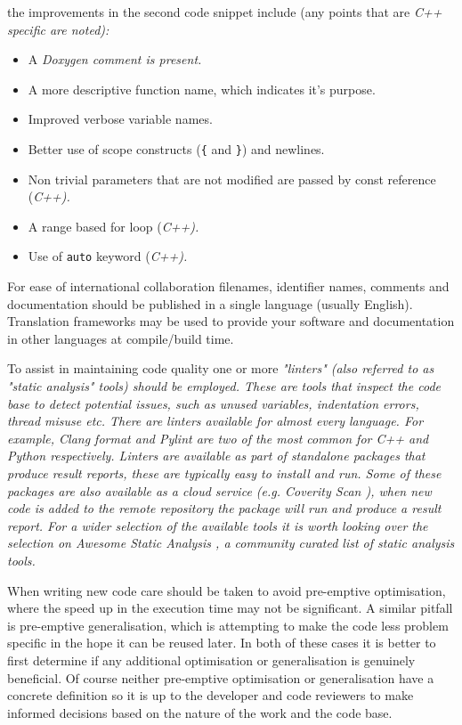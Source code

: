 \documentclass[jnr]{iosart2x}
\begin{document}
the improvements in the second code snippet include (any points that are \it{C++} specific are noted):
\begin{itemize}
  \item{A \it Doxygen \cite{doxygen} comment is present.}
  \item{A more descriptive function name, which indicates it's purpose.}
  \item{Improved verbose variable names.}
  \item{Better use of scope constructs (\texttt{\{} and \texttt{\}}) and newlines.}
  \item{Non trivial parameters that are not modified are passed by const reference (\it C++).}
  \item{A range based for loop (\it C++).}
  \item{Use of \texttt{auto} keyword (\it C++).}
\end{itemize}

For ease of international collaboration filenames, identifier names, comments and documentation should be published in a single language (usually English).
Translation frameworks may be used to provide your software and documentation in other languages at compile/build time.

To assist in maintaining code quality one or more \it{"linters"} (also referred to as "static analysis" tools) should be employed.
These are tools that inspect the code base to detect potential issues, such as unused variables, indentation errors, thread misuse etc.
There are linters available for almost every language.
For example, \it Clang format \cite{Clang} and \it Pylint \cite{Pylint} are two of the most common for \it C++ and \it Python respectively.
Linters are available as part of standalone packages that produce result reports, these are typically easy to install and run.
Some of these packages are also available as a cloud service (e.g. \it{Coverity Scan} \cite{coverity}), when new code is added to the remote repository the package will run and produce a result report.
For a wider selection of the available tools it is worth looking over the selection on Awesome Static Analysis \cite{awesome_static_analysis}, a community curated list of static analysis tools.

When writing new code care should be taken to avoid pre-emptive optimisation, where the speed up in the execution time may not be significant.
A similar pitfall is pre-emptive generalisation, which is attempting to make the code less problem specific in the hope it can be reused later.
In both of these cases it is better to first determine if any additional optimisation or generalisation is genuinely beneficial.
Of course neither pre-emptive optimisation or generalisation have a concrete definition so it is up to the developer and code reviewers to make informed decisions based on the nature of the work and the code base.
\end{document}
